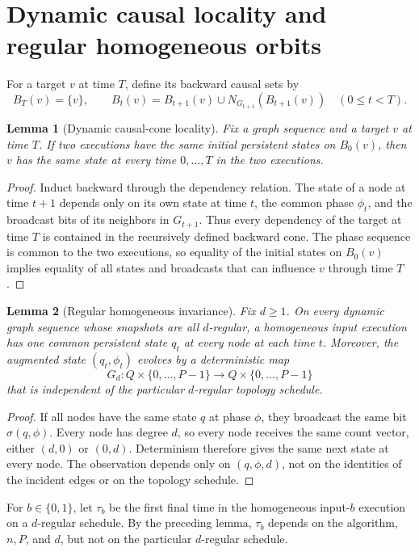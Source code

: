 \documentclass[11pt]{article}
\newtheorem{lemma}{Lemma}
\theoremstyle{remark}
\begin{document}
\section{Dynamic causal locality and regular homogeneous orbits}

For a target $v$ at time $T$, define its backward causal sets by
\[
B_T(v)=\{v\},
\qquad
B_t(v)=B_{t+1}(v)\cup N_{G_{t+1}}(B_{t+1}(v))
\quad(0\le t<T).
\]

\begin{lemma}[Dynamic causal-cone locality]
Fix a graph sequence and a target $v$ at time $T$.  If two executions have the same
initial persistent states on $B_0(v)$, then $v$ has the same state at every time
$0,\ldots,T$ in the two executions.
\end{lemma}

\begin{proof}
Induct backward through the dependency relation.  The state of a node at time $t+1$
depends only on its own state at time $t$, the common phase $\phi_t$, and the broadcast
bits of its neighbors in $G_{t+1}$.  Thus every dependency of the target at time $T$
is contained in the recursively defined backward cone.  The phase sequence is common
to the two executions, so equality of the initial states on $B_0(v)$ implies equality
of all states and broadcasts that can influence $v$ through time $T$.
\end{proof}

\begin{lemma}[Regular homogeneous invariance]
Fix $d\ge1$.  On every dynamic graph sequence whose snapshots are all $d$-regular,
a homogeneous input execution has one common persistent state $q_t$ at every node
at each time $t$.  Moreover, the augmented state $(q_t,\phi_t)$ evolves by a
deterministic map
\[
G_d:Q\times\{0,\ldots,P-1\}\to Q\times\{0,\ldots,P-1\}
\]
that is independent of the particular $d$-regular topology schedule.
\end{lemma}

\begin{proof}
If all nodes have the same state $q$ at phase $\phi$, they broadcast the same bit
$\sigma(q,\phi)$.  Every node has degree $d$, so every node receives the same count
vector, either $(d,0)$ or $(0,d)$.  Determinism therefore gives the same next state
at every node.  The observation depends only on $(q,\phi,d)$, not on the identities
of the incident edges or on the topology schedule.
\end{proof}

For $b\in\{0,1\}$, let $\tau_b$ be the first final time in the homogeneous input-$b$
execution on a $d$-regular schedule.  By the preceding lemma, $\tau_b$ depends on
the algorithm, $n,P$, and $d$, but not on the particular $d$-regular schedule.
\end{document}
